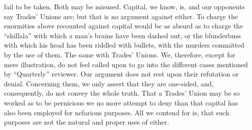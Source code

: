 fail to be taken. Both may be misused. Capital, we know, is, and our
opponents say Trades' Unions are; but that is no argument against
either. To charge the enormities above recounted against capital would
be as absurd as to charge the ``shillala'' with which a man's brains
have been dashed out, or the blunderbuss with which his head has been
riddled with bullets, with the murders committed by the use of them. The
same with Trades' Unions. We, therefore, except for mere illustration,
do not feel called upon to go into the different cases mentioned by
``Quarterly'' reviewer. Our argument does not rest upon their refutation
or denial. Concerning them, we only assert that they are one-sided, and,
consequently, do not convey the whole truth. That a Trades' Union may be
so worked as to be pernicious we no more attempt to deny than that
capital has also been employed for nefarious purposes. All we contend
for is, that such purposes are not the natural and proper uses of
either.